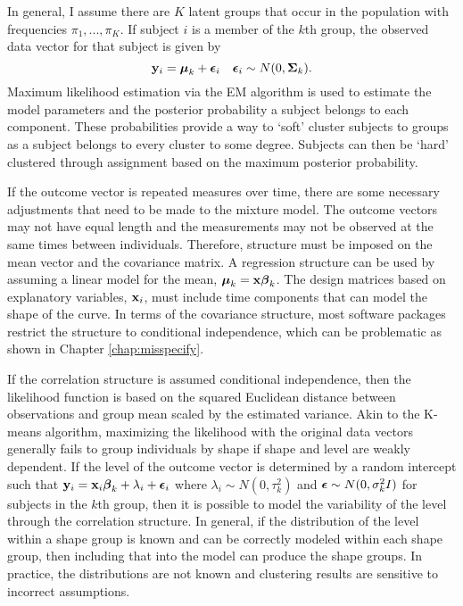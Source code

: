 In general, I assume there are $K$ latent groups that occur in the population with frequencies $\pi_{1},...,\pi_{K}$. If subject $i$ is a member of the $k$th group, the observed data vector for that subject is given by
$$\mathbf y_{i} = \boldsymbol\mu_{k}+\boldsymbol\epsilon_{i}\quad \boldsymbol\epsilon_{i} \sim N(0,\boldsymbol\Sigma_{k}).$$
Maximum likelihood estimation via the EM algorithm is used to estimate the model parameters and the posterior probability a subject belongs to each component. These probabilities provide a way to `soft' cluster subjects to groups as a subject belongs to every cluster to some degree. Subjects can then be `hard' clustered through assignment based on the maximum posterior probability. 

If the outcome vector is repeated measures over time, there are some necessary adjustments that need to be made to the mixture model. The outcome vectors may not have equal length and the measurements may not be observed at the same times between individuals. Therefore, structure must be imposed on the mean vector and the covariance matrix. A regression structure can be used by assuming a linear model for the mean, $\boldsymbol\mu_k=\mathbf x \boldsymbol\beta_k$. The design matrices based on explanatory variables, $\mathbf x_{i}$, must include time components that can model the shape of the curve.  In terms of the covariance structure, most software packages restrict the structure to conditional independence, which can be problematic as shown in Chapter \ref{chap:misspecify}.

If the correlation structure is assumed conditional independence, then the likelihood function is based on the squared Euclidean distance between observations and group mean scaled by the estimated variance. Akin to the K-means algorithm, maximizing the likelihood with the original data vectors generally fails to group individuals by shape if shape and level are weakly dependent. If the level of the outcome vector is determined by a random intercept such that $\mathbf y_{i} = \mathbf x_{i}\boldsymbol\beta_{k} + \lambda_{i}+\boldsymbol\epsilon_{i}$ where $\lambda_{i}\sim N(0,\tau^{2}_{k})$ and $\boldsymbol\epsilon\sim N(0,\sigma^{2}_{k}I)$ for subjects in the $k$th group, then it is possible to model the variability of the level through the correlation structure. In general, if the distribution of the level within a shape group is known and can be correctly modeled within each shape group, then including that into the model can produce the shape groups. In practice, the distributions are not known and clustering results are sensitive to incorrect assumptions.

